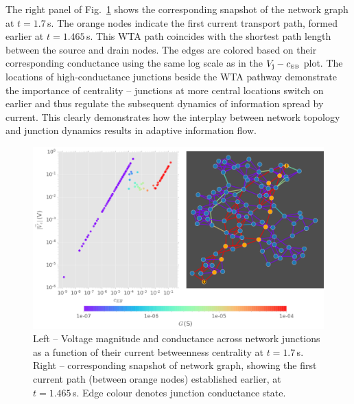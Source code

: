 \documentclass[fleqn,10pt,  reprint, amsmath,amssymb,aps, floatfix]{wlscirep}
\newcommand{\Vj}{V_{\rm j}}
\newcommand{\cEB}{c_{\scriptscriptstyle \rm EB}}
\begin{document}
The right panel of Fig.~\ref{fig:ebc_nw} shows the corresponding snapshot of the network graph at $t = 1.7\,$s. The orange nodes indicate the first current transport path, formed earlier at $t = 1.465 \,$s. This WTA path coincides with the shortest path length between the source and drain nodes. The edges are colored based on their corresponding conductance using the same log scale as in the $\Vj - \cEB$ plot. The locations of high-conductance junctions beside the WTA pathway demonstrate the importance of centrality -- junctions at more central locations switch on earlier and thus regulate the subsequent dynamics of information spread by current. This clearly demonstrates how the interplay between network topology and junction dynamics results in adaptive information flow.


\begin{figure}[h]
	\centering
	\includegraphics[width=0.8\linewidth]{figure/ebc_nw}
	\caption{Left -- Voltage magnitude and conductance across network junctions as a function of their current betweenness centrality at $t = 1.7\,$s. Right -- corresponding snapshot of network graph, showing the first current path (between orange nodes) established earlier, at $t = 1.465\,$s. Edge colour denotes junction conductance state.}
	\label{fig:ebc_nw}
\end{figure}


\end{document}
